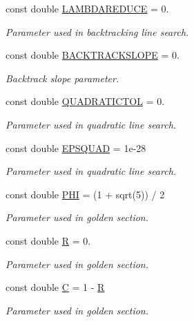 {\bf }\par
\begin{DoxyCompactItemize}
\item 
const double \hyperlink{classCGMethod_a0fa651bde0efa2e195ec6a367a0e346e}{L\+A\+M\+B\+D\+A\+R\+E\+D\+U\+C\+E} = 0.
\begin{DoxyCompactList}\small\item\em Parameter used in backtracking line search. \end{DoxyCompactList}\item 
const double \hyperlink{classCGMethod_aa7a8cad90cb1961052e323ded645b4c2}{B\+A\+C\+K\+T\+R\+A\+C\+K\+S\+L\+O\+P\+E} = 0.
\begin{DoxyCompactList}\small\item\em Backtrack slope parameter. \end{DoxyCompactList}\end{DoxyCompactItemize}

{\bf }\par
\begin{DoxyCompactItemize}
\item 
const double \hyperlink{classCGMethod_acd9c51fe93f6d563f731dd2e30eb7922}{Q\+U\+A\+D\+R\+A\+T\+I\+C\+T\+O\+L} = 0.
\begin{DoxyCompactList}\small\item\em Parameter used in quadratic line search. \end{DoxyCompactList}\item 
const double \hyperlink{classCGMethod_adb2a688fe52a8729d703d81e52b9fdb3}{E\+P\+S\+Q\+U\+A\+D} = 1e-\/28
\begin{DoxyCompactList}\small\item\em Parameter used in quadratic line search. \end{DoxyCompactList}\end{DoxyCompactItemize}

{\bf }\par
\begin{DoxyCompactItemize}
\item 
const double \hyperlink{classCGMethod_ab6ca0706dec56fe6e35f15f9791b3e23}{P\+H\+I} = (1 + sqrt(5)) / 2
\begin{DoxyCompactList}\small\item\em Parameter used in golden section. \end{DoxyCompactList}\item 
const double \hyperlink{classCGMethod_a2e7906b4b29a1b76dca43d56eaf2efac}{R} = 0.
\begin{DoxyCompactList}\small\item\em Parameter used in golden section. \end{DoxyCompactList}\item 
const double \hyperlink{classCGMethod_af8587ca1c0394c244ce84fe8a6ad29ff}{C} = 1 -\/ \hyperlink{classCGMethod_a2e7906b4b29a1b76dca43d56eaf2efac}{R}
\begin{DoxyCompactList}\small\item\em Parameter used in golden section. \end{DoxyCompactList}\end{DoxyCompactItemize}




